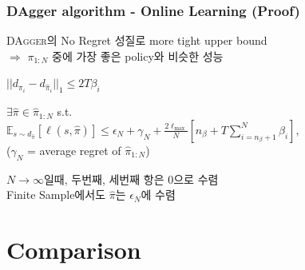 \documentclass[11pt,xcolor={dvipsnames},hyperref={pdftex,pdfpagemode=UseNone,hidelinks,pdfdisplaydoctitle=true},usepdftitle=false]{beamer}
\begin{document}
\begin{frame}
\frametitle{DAgger algorithm - Online Learning (Proof)}
\textsc{DAgger}의 No Regret 성질로 more tight upper bound \\
$\Rightarrow$ $\pi_{1:N}$ 중에 가장 좋은 policy와 비슷한 성능

\begin{theorem}
    $||d_{\pi_i} - d_{\hat{\pi}_i}||_1 \leq 2 T \beta_i$
\end{theorem}    

\begin{theorem}
    $\exists \hat{\pi} \in \hat{\pi}_{1:N}$ s.t. \\
    $\mathbb{E}_{s \sim d_{\hat{\pi}}}[ \ell(s,\hat{\pi}) ] \leq \epsilon_N + \gamma_N + \frac{2 \ell_{\max}}{N} [n_\beta + T \sum_{i=n_\beta+1}^N \beta_i]$, \\
    ($\gamma_N$ = average regret of $\hat{\pi}_{1:N}$)
\end{theorem}    

$N \to \infty$일때, 두번째, 세번째 항은 0으로 수렴 \\
Finite Sample에서도 $\hat{\pi}$는 $\epsilon_N$에 수렴

\end{frame}

\section*{Comparison}
\end{document}
